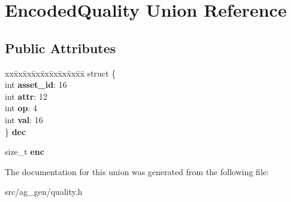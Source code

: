 \hypertarget{union_encoded_quality}{}\section{Encoded\+Quality Union Reference}
\label{union_encoded_quality}
\subsection*{Public Attributes}
\begin{DoxyCompactItemize}
\item 
\mbox{\label{union_encoded_quality_ad06ef6dfc741c545d17702e1b4f41388}} 
\begin{tabbing}
xx\=xx\=xx\=xx\=xx\=xx\=xx\=xx\=xx\=\kill
struct \{\\
\>int {\bfseries asset\_id}: 16\\
\>int {\bfseries attr}: 12\\
\>int {\bfseries op}: 4\\
\>int {\bfseries val}: 16\\
\} {\bfseries dec}\\

\end{tabbing}\item 
\mbox{\label{union_encoded_quality_a1296310c98a4f422ae54260019a74873}} 
size\+\_\+t {\bfseries enc}
\end{DoxyCompactItemize}


The documentation for this union was generated from the following file\+:\begin{DoxyCompactItemize}
\item 
src/ag\+\_\+gen/quality.\+h\end{DoxyCompactItemize}
